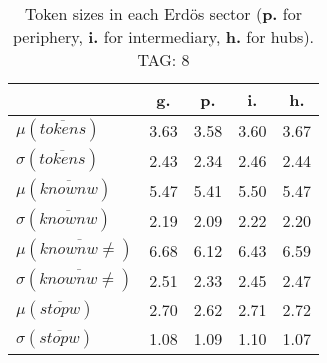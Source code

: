 \begin{table}[h!]
\begin{center}
\begin{tabular}{| l | c | c | c | c |}\hline
 & g. & p. & i. & h. \\\hline
$\mu(\overline{tokens})$ & 3.63  & 3.58  & 3.60  & 3.67 \\\hline
$\sigma(\overline{tokens})$ & 2.43  & 2.34  & 2.46  & 2.44 \\\hline
$\mu(\overline{knownw})$ & 5.47  & 5.41  & 5.50  & 5.47 \\\hline
$\sigma(\overline{knownw})$ & 2.19  & 2.09  & 2.22  & 2.20 \\\hline
$\mu(\overline{knownw \neq})$ & 6.68  & 6.12  & 6.43  & 6.59 \\\hline
$\sigma(\overline{knownw \neq})$ & 2.51  & 2.33  & 2.45  & 2.47 \\\hline
$\mu(\overline{stopw})$ & 2.70  & 2.62  & 2.71  & 2.72 \\\hline
$\sigma(\overline{stopw})$ & 1.08  & 1.09  & 1.10  & 1.07 \\\hline
\end{tabular}
\caption{Token sizes in each Erd\"os sector ({{\bf p.}} for periphery, {{\bf i.}} for intermediary, {{\bf h.}} for hubs). TAG: 8}
\end{center}
\end{table}